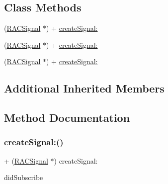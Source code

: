 \subsection*{Class Methods}
\begin{DoxyCompactItemize}
\item 
(\mbox{\hyperlink{interface_r_a_c_signal}{R\+A\+C\+Signal}} $\ast$) + \mbox{\hyperlink{interface_r_a_c_dynamic_signal_aeffa754150754dd6296d5225b5c9c7fe}{create\+Signal\+:}}
\item 
(\mbox{\hyperlink{interface_r_a_c_signal}{R\+A\+C\+Signal}} $\ast$) + \mbox{\hyperlink{interface_r_a_c_dynamic_signal_aeffa754150754dd6296d5225b5c9c7fe}{create\+Signal\+:}}
\item 
(\mbox{\hyperlink{interface_r_a_c_signal}{R\+A\+C\+Signal}} $\ast$) + \mbox{\hyperlink{interface_r_a_c_dynamic_signal_aeffa754150754dd6296d5225b5c9c7fe}{create\+Signal\+:}}
\end{DoxyCompactItemize}
\subsection*{Additional Inherited Members}


\subsection{Method Documentation}
\mbox{\label{interface_r_a_c_dynamic_signal_aeffa754150754dd6296d5225b5c9c7fe}} 
\subsubsection{\texorpdfstring{create\+Signal\+:()}{createSignal:()}\hspace{0.1cm}{\footnotesize\ttfamily [1/3]}}
{\footnotesize\ttfamily + (\mbox{\hyperlink{interface_r_a_c_signal}{R\+A\+C\+Signal}} $\ast$) create\+Signal\+: \begin{DoxyParamCaption}\item[{(\mbox{\hyperlink{interface_r_a_c_disposable}{R\+A\+C\+Disposable}} $\ast$($^\wedge$)(id$<$\mbox{\hyperlink{interface_r_a_c_subscriber}{R\+A\+C\+Subscriber}}$>$ subscriber))}]{did\+Subscribe }\end{DoxyParamCaption}}

